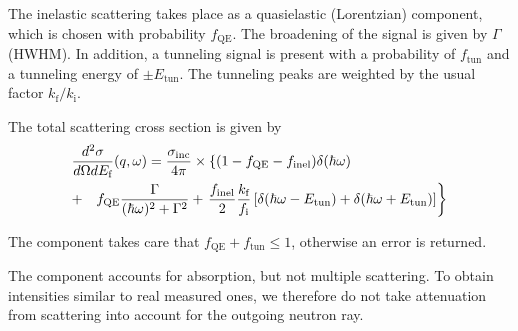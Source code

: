 The inelastic scattering takes place as a quasielastic (Lorentzian)
component, which is chosen with probability $f_\textrm{QE}$.
The broadening of the signal is given by $\Gamma$ (HWHM).
In addition, a tunneling signal is present with a probability of $f_\textrm{tun}$ 
and a tunneling energy of $\pm E_\textrm{tun}$. 
The tunneling peaks are weighted by the usual factor $k_\textrm{f}/k_\textrm{i}$.

The total scattering cross section is given by
\begin{eqnarray}
\lefteqn{\frac{d^2\sigma}{d\Omega dE_\textrm{f}}(q,\omega) = \frac{\sigma_\textrm{inc}}{4\pi}
\times \left\{ (1-f_\textrm{QE}-f_\textrm{inel}) \delta(\hbar \omega) \right. }  \\
 &+& f_\textrm{QE} \frac{\Gamma}{(\hbar\omega)^2+\Gamma^2}
 + \left.\frac{f_\textrm{inel}}{2} \frac{k_\textrm{f}}{f_\textrm{i}} 
   \left[\delta(\hbar\omega-E_\textrm{tun}) + \delta(\hbar\omega+E_\textrm{tun}) \right] \right\} \nonumber
\end{eqnarray}

The component takes care that 
$f_\textrm{QE} + f_\textrm{tun} \leq 1$, otherwise an error is returned.

The component accounts for absorption, 
but not multiple scattering. To obtain
intensities similar to real measured ones, we therefore do not 
take attenuation from scattering into account for the outgoing
neutron ray.


